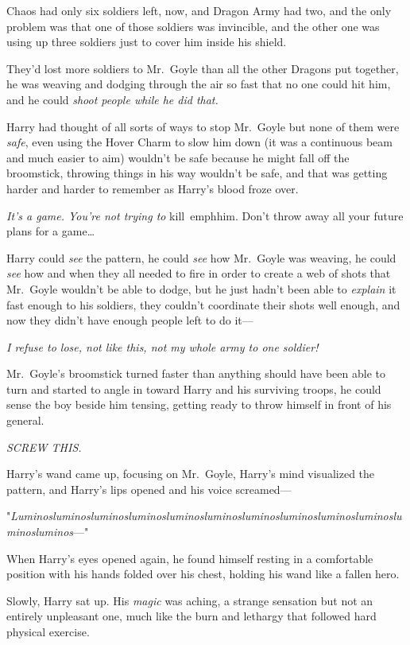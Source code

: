 Chaos had only six soldiers left, now, and Dragon Army had two, and the only 
problem was that one of those soldiers was invincible, and the other one was 
using up three soldiers just to cover him inside his shield.

They'd lost more soldiers to Mr.~Goyle than all the other Dragons put together, 
he was weaving and dodging through the air so fast that no one could hit him, 
and he could \emph{shoot people while he did that.}

Harry had thought of all sorts of ways to stop Mr.~Goyle but none of them were 
\emph{safe}, even using the Hover Charm to slow him down (it was a continuous 
beam and much easier to aim) wouldn't be safe because he might fall off the 
broomstick, throwing things in his way wouldn't be safe, and that was getting 
harder and harder to remember as Harry's blood froze over.

\emph{It's a game. You're not trying to} kill\ emph{him. Don't throw away all 
your future plans for a game{\ldots}}

Harry could \emph{see} the pattern, he could \emph{see} how Mr.~Goyle was 
weaving, he could \emph{see} how and when they all needed to fire in order to 
create a web of shots that Mr.~Goyle wouldn't be able to dodge, but he just 
hadn't been able to \emph{explain} it fast enough to his soldiers, they 
couldn't coordinate their shots well enough, and now they didn't have enough 
people left to do it---

\emph{I refuse to lose, not like this, not my whole army to one soldier!}

Mr.~Goyle's broomstick turned faster than anything should have been able to 
turn and started to angle in toward Harry and his surviving troops, he could 
sense the boy beside him tensing, getting ready to throw himself in front of 
his general.

\emph{SCREW THIS.}

Harry's wand came up, focusing on Mr.~Goyle, Harry's mind visualized the 
pattern, and Harry's lips opened and his voice screamed---

"\emph{Lu\-min\-os\-lu\-min\-os\-lu\-min\-os\-lu\-min\-os\-lu\-min\-os\-lu\-min\-os\-lu\-min\-os\-lu\-min\-os\-lu\-min\-os\-lu\-min\-os\-lu\-min\-os\-lu\-min\-os}---"

\sbreak
When Harry's eyes opened again, he found himself resting in a comfortable 
position with his hands folded over his chest, holding his wand like a fallen 
hero.

Slowly, Harry sat up. His \emph{magic} was aching, a strange sensation but not 
an entirely unpleasant one, much like the burn and lethargy that followed hard 
physical exercise.

